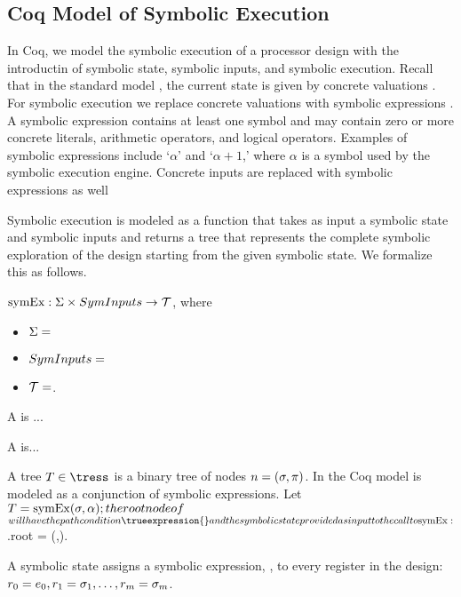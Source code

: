\subsection{Coq Model of Symbolic Execution}
In Coq, we model the symbolic execution of a processor design \hardwaredesign{}
with the introductin of symbolic state, symbolic inputs, and symbolic
execution. Recall that in the standard model \hardwaredesign{}, the current
state is given by concrete valuations . For symbolic execution we
replace concrete valuations  with symbolic expressions
\symexpression. A symbolic expression
\symexpression{} contains at least one symbol and may contain zero or more concrete
literals, arithmetic operators, and logical operators. Examples of
symbolic expressions include `$\alpha$' and `$\alpha + 1$,' where
$\alpha$ is a symbol used by the symbolic execution engine. Concrete inputs are
replaced with symbolic expressions as well 

Symbolic execution is modeled as a function that takes as input a symbolic state
and symbolic inputs and returns a tree that represents the complete symbolic
exploration of the design starting from the given symbolic state. We formalize
this as follows.

$\mathrm{symEx}: \Sigma \times SymInputs \rightarrow \mathcal{T}$, where
\begin{itemize}
\item $\Sigma = $
\item $SymInputs =$
\item $\mathcal{T} =$.
\end{itemize}

A \symstate{} is ...

A \syminput{} is...

A tree $\tree \in \tress$ is a binary tree of nodes $n = (\sigma,\pi)$. In
the Coq model \pi is modeled as a conjunction of symbolic expressions. Let
$T = \mathrm{symEx}(\sigma,\alpha); the root node of $\tree$ will have
the path condition \trueexpression{} and the symbolic state provided as input to
the call to \symexecution{}: $\tree.root = (\symstate,\trueexpression).

A symbolic state assigns a symbolic expression, \symexpression, to every register in the design: $r_0 =
e_0, r_1 = \sigma_1, \ldots, r_m = \sigma_m$. 

